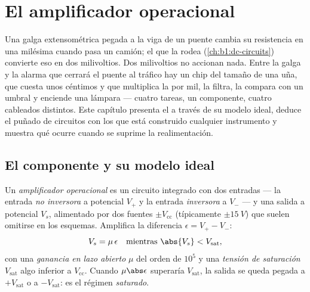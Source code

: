 \chapter{El amplificador operacional}\label{ch:b1:operational-amplifier}

Una galga extensométrica pegada a la viga de un puente cambia su
resistencia en una milésima cuando pasa un camión; el 
que la rodea (\cref{ch:b1:dc-circuits}) convierte eso en dos milivoltios.
Dos milivoltios no accionan nada. Entre la galga y la alarma que cerrará el
puente al tráfico hay un chip del tamaño de una uña, que cuesta unos
céntimos y que multiplica la  por mil, la filtra, la compara con un
umbral y enciende una lámpara --- cuatro tareas, un componente, cuatro
cableados distintos. Este capítulo presenta el  a
través de su modelo ideal, deduce el puñado de circuitos con los que está
construido cualquier instrumento y muestra qué ocurre cuando se suprime la
realimentación.

\section{El componente y su modelo ideal}

\begin{definition}\label{def:b1:operational-amplifier:opamp}
Un \emph{amplificador operacional} es un circuito integrado con dos
entradas --- la entrada \emph{no inversora} a potencial $V_+$ y la entrada
\emph{inversora} a $V_-$ --- y una salida a potencial $V_s$, alimentado
por dos fuentes $\pm V_{\mathrm{cc}}$ (típicamente $\pm\qty{15}{V}$) que
suelen omitirse en los esquemas. Amplifica la diferencia
$\epsilon = V_+ - V_-$:
\[
V_s = \mu\,\epsilon \quad\text{mientras } \abs{V_s} < V_{\mathrm{sat}},
\]
con una \emph{ganancia en lazo abierto} $\mu$ del orden de $10^5$ y una
\emph{tensión de saturación} $V_{\mathrm{sat}}$ algo inferior a
$V_{\mathrm{cc}}$. Cuando $\mu\abs\epsilon$ superaría $V_{\mathrm{sat}}$,
la salida se queda pegada a $+V_{\mathrm{sat}}$ o a $-V_{\mathrm{sat}}$:
es el régimen \emph{saturado}.
\end{definition}

